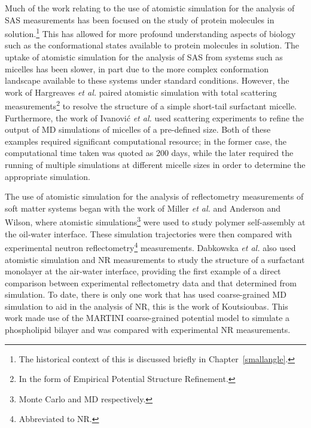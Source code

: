 Much of the work relating to the use of atomistic simulation for the analysis of SAS measurements has been focused on the study of protein molecules in solution.\footnote{The historical context of this is discussed briefly in Chapter~\ref{smallangle}.}
This has allowed for more profound understanding aspects of biology such as the conformational states available to protein molecules in solution.\autocite{bowerman_determining_2017}
The uptake of atomistic simulation for the analysis of SAS from systems such as micelles has been slower, in part due to the more complex conformation landscape available to these systems under standard conditions.
However, the work of Hargreaves \emph{et al.} paired atomistic simulation with total scattering measurements\footnote{In the form of Empirical Potential Structure Refinement.} to resolve the structure of a simple short-tail surfactant micelle.\autocite{hargreaves_atomistic_2011}
Furthermore, the work of Ivanovi\'{c} \emph{et al.} used scattering experiments to refine the output of MD simulations of micelles of a pre-defined size.\autocite{ivanovic_temperature-dependent_2018}
Both of these examples required significant computational resource; in the former case, the computational time taken was quoted as 200 days, while the later required the running of multiple simulations at different micelle sizes in order to determine the appropriate simulation.

The use of atomistic simulation for the analysis of reflectometry measurements of soft matter systems began with the work of Miller \emph{et al.} and Anderson and Wilson,\autocite{miller_monte_2003,anderson_molecular_2004} where atomistic simulations\footnote{Monte Carlo and MD respectively.} were used to study polymer self-assembly at the oil-water interface.
These simulation trajectories were then compared with experimental neutron reflectometry\footnote{Abbreviated to NR.} measurements.
Dabkowska \emph{et al.} also used atomistic simulation and NR measurements to study the structure of a surfactant monolayer at the air-water interface, providing the first example of a direct comparison between experimental reflectometry data and that determined from simulation.\autocite{dabkowska_modulation_2014}
To date, there is only one work that has used coarse-grained MD simulation to aid in the analysis of NR, this is the work of Koutsioubas.\autocite{koutsioubas_combined_2016}
This work made use of the MARTINI coarse-grained potential model to simulate a phospholipid bilayer and was compared with experimental NR measurements.
